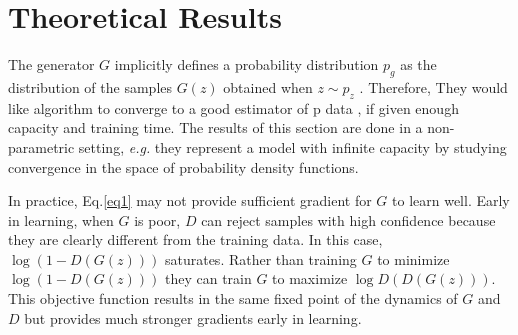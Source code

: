 \documentclass[10pt,twocolumn,letterpaper]{article}
\begin{document}
\section{Theoretical Results}
The generator $G$ implicitly defines a probability distribution $p_g$ as the distribution of the samples
$G\left(z\right)$ obtained when $z \sim p_z$ . Therefore, They would like algorithm to converge to a good estimator
of p data , if given enough capacity and training time. The results of this section are done in a non-parametric setting, \textit{e.g.} they represent a model with infinite capacity by studying convergence in the space of probability density functions.
\par
In practice, Eq.\ref{eq1} may not provide sufficient gradient for $G$ to learn well. Early in learning,
when $G$ is poor, $D$ can reject samples with high confidence because they are clearly different from
the training data. In this case, $\log\left(1-D\left(G\left(z\right)\right)\right)$ saturates. Rather than training $G$ to minimize
$\log\left(1-D\left(G\left(z\right)\right)\right)$ they can train $G$ to maximize $\log D\left(D\left(G\left(z\right)\right)\right)$. This objective function results in the
same fixed point of the dynamics of $G$ and $D$ but provides much stronger gradients early in learning.
{\small
	
	
}
\end{document}
